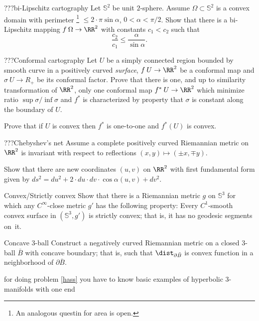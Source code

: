 
\begin{pr}{}{???bi-Lipschitz cartography} Let $\mathbb{S}^2$ be unit $2$-sphere.
Assume $\Omega\subset \mathbb{S}^2$ is a convex domain with perimeter%
\footnote{An analogous questin for area is open.}
$\le 2\cdot\pi\sin\alpha$, $0<\alpha<\pi/2$.
Show that there is a bi-Lipschitz mapping $f\:\Omega\to \RR^2$
with constants $c_1 < c_2$ such that
$$\frac{c_2}{c_1}\le \frac{\alpha}{\sin\alpha}.$$
\end{pr}


\begin{pr}{}{???Conformal cartography}
Let $U$ be a simply connected region
bounded by smooth curve in a positively curved \emph{surface}, $f\:U\to \RR^2$
be a conformal map and $\sigma\:U\to R_+$ be its conformal factor.
Prove that there is one, and up to similarity transformation of $\RR^2$,
only one conformal map $f^*\:U\to \RR^2$ which minimize ratio
$\sup\sigma/\inf\sigma$ and $f^*$ is characterized by property that $\sigma$
is constant along the boundary of $U$.

Prove that if $U$ is convex then $f^*$
is one-to-one and $f^*(U)$ is convex.
\end{pr}

\begin{pr}{}{???Chebyshev's net}
Assume a complete positively curved Riemannian metric on $\RR^2$ is invariant with respect to reflections $(x,y)\mapsto (\pm x,\mp y)$.

Show that there are new coordinates $(u,v)$ on $\RR^2$ with first fundamental form given by
\def\d{d}
$\d s^2=\d u^2+2\cdot\d u\cdot\d v\cdot \cos\alpha(u,v)+\d v^2$.
\end{pr}

\begin{pr}{}{Convex/Strictly convex}\label{strict-convex} 
Show that there is a Riemannian metric $g$ on $\mathbb{S}^3$ for which any  $C^\infty$-close metric $g'$ has the following property: 
Every $C^1$-smooth convex surface in $(\mathbb{S}^3,g')$ is strictly convex; 
that is, it has no geodesic segments on~it.
\sign{}
\end{pr}

\begin{pr}{\thm}{Concave 3-ball}\label{hass}
Construct a negatively curved Riemannian metric on a closed 3-ball $\bar B$ with concave boundary; 
that is, such that  $\dist_{\partial \bar B}$ is convex function in a neighborhood of $\partial \bar B$.
\end{pr}
for doing problem \ref{hass} you have to know basic examples of hyperbolic 3-manifolds with one end








